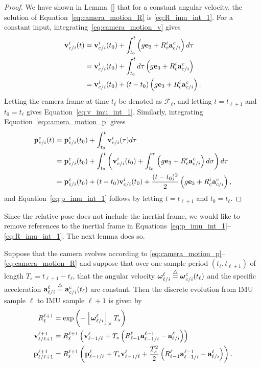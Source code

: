 \begin{proof}
	We have shown in Lemma~\ref{} that for a constant angular velocity, the solution of Equation~\eqref{eq:camera_motion_R} is \eqref{eq:R_imu_int_1}.
	For a constant input, integrating~\eqref{eq:camera_motion_v} gives
	\begin{align*}
	\mathbf{v}_{c/i}^i(t) &= \mathbf{v}_{c/i}^i(t_0) + \int_{t_0}^t \left(g\mathbf{e}_3 + R_c^i \mathbf{a}_{c/i}^c\right)d\tau \\
		&= \mathbf{v}_{c/i}^i(t_0) + \int_{t_0}^t d\tau \left(g\mathbf{e}_3 + R_c^i \mathbf{a}_{c/i}^c\right) \\
		&= \mathbf{v}_{c/i}^i(t_0) + (t-t_0) \left(g\mathbf{e}_3 + R_c^i \mathbf{a}_{c/i}^c\right).
	\end{align*}
	Letting the camera frame at time $t_\ell$ be denoted as $\mathcal{F}_\ell$, and letting $t=t_{\ell+1}$ and $t_0=t_{\ell}$ gives Equation~\eqref{eq:v_imu_int_1}.  Similarly, integrating Equation~\eqref{eq:camera_motion_p} gives
	\begin{align*}
	\mathbf{p}_{c/i}^c(t) &= \mathbf{p}_{c/i}^c(t_0) + \int_{t_0}^t \mathbf{v}_{c/i}^i(\tau)d\tau \\
		&= \mathbf{p}_{c/i}^c(t_0) + \int_{t_0}^t \left(\mathbf{v}_{c/i}^i(t_0) + \int_{t_0}^\tau \left(g\mathbf{e}_3 + R_c^i \mathbf{a}_{c/i}^c\right)d\sigma \right) d\tau \\
		&= \mathbf{p}_{c/i}^c(t_0) + (t-t_0)\mathbf{v}_{c/i}^i(t_0) + \frac{(t-t_0)^2}{2}\left(g\mathbf{e}_3 + R_c^i \mathbf{a}_{c/i}^c\right),
	\end{align*}
	and Equation~\eqref{eq:p_imu_int_1} follows by letting $t=t_{\ell+1}$ and $t_0=t_{\ell}$.
\end{proof}
Since the relative pose does not include the inertial frame, we would like to remove references to the inertial frame in Equations~\eqref{eq:p_imu_int_1}--\eqref{eq:R_imu_int_1}.  The next lemma does so.
\begin{lemma}
	Suppose that the camera evolves according to \eqref{eq:camera_motion_p}--\eqref{eq:camera_motion_R} and suppose that over one sample period $(t_\ell, t_{\ell+1})$ of length $T_s=t_{\ell+1}-t_\ell$, that the angular velocity $\boldsymbol{\omega}_{\ell/i}^{\ell}\stackrel{\triangle}{=}\boldsymbol{\omega}_{c/i}^c(t_\ell)$ and the specific acceleration $\mathbf{a}_{\ell/i}^{\ell}\stackrel{\triangle}{=} \mathbf{a}_{c/i}^c(t_\ell)$ are constant.  Then the discrete evolution from IMU sample $\ell$ to IMU sample $\ell+1$ is given by
	\begin{align}
	R_{\ell}^{\ell+1} &= \exp\left(-\ss{\omegabf_{\ell/i}^{\ell}} T_s \right)
		\label{eq:R_imu_int_2} \\
	\vbf_{\ell/\ell+1}^{\ell+1} &= R_{\ell}^{\ell+1}\left( \vbf_{\ell-1/\ell}^{\ell} 
		+ T_s \left(R_{\ell-1}^\ell \abf_{\ell-1/i}^{\ell-1} - \abf_{\ell/i}^\ell \right) \right)  \label{eq:v_imu_int_2} \\
	\pbf_{\ell/\ell+1}^{\ell+1} &= R_{\ell}^{\ell+1}\left(\pbf_{\ell-1/\ell}^{\ell} 
		+T_s\vbf_{\ell-1/\ell}^{\ell} + \frac{T_s^2}{2}\left(R_{\ell-1}^\ell \abf_{\ell-1/i}^{\ell-1} - \abf_{\ell/i}^{\ell}\right)\right).
		\label{eq:p_imu_int_2}
\end{align}
\end{lemma}
